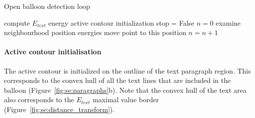 
\begin{algorithm}
\caption{Open balloon detection loop}
\label{al:be:method}
\begin{algorithmic}
  \STATE compute $E_{text}$ energy
  \STATE active contour initialization
  \STATE stop = False
    \STATE $n = 0$
      \STATE examine neighbourhood position energies
		\STATE move point to this position
		\STATE $n=n+1$
      \ENDIF
    \ENDFOR
    \ENDIF
  \ENDWHILE%
\ENDFOR
\end{algorithmic}
\end{algorithm}

\paragraph{Active contour initialisation}
\label{sec:se:cont_init}

The active contour is initialized on the outline of the text paragraph region.
This corresponds to the convex hull of all the text lines that are included in the balloon (Figure~\ref{fig:se:paragraphs}b).
Note that the convex hull of the text area also corresponds to the $E_{text}$ maximal value border (Figure~\ref{fig:se:distance_transform}).



